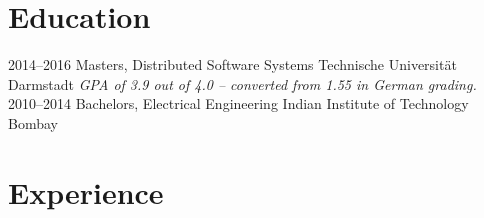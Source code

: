 \documentclass[]{friggeri-cv}
\begin{document}
\section{Education}
    \begin{entrylist}
        \entry
            {2014–2016}
            {Masters, {\normalfont Distributed Software Systems}}
            {Technische Universität Darmstadt}
            {\emph{GPA of 3.9 out of 4.0 -- converted from 1.55 in German grading.}}
        \entry
            {2010–2014}
            {Bachelors, {\normalfont Electrical Engineering}}
            {Indian Institute of Technology Bombay}
            {}%
    \end{entrylist}
    \vspace{-0.3cm}

\section{Experience}
\end{document}
